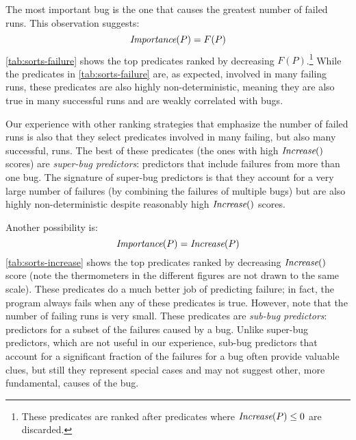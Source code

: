 The most important bug is the one that causes the greatest number
of failed runs.  This observation suggests:
\[ \textit{Importance}(P) = F(P) \]
\autoref{tab:sorts-failure} shows the top predicates 
ranked by decreasing $F(P)$.\footnote{These predicates are ranked after predicates where $\textit{Increase}(P) \leq 0$ are discarded.}
While the predicates in \autoref{tab:sorts-failure} are, as expected, involved
in many failing runs, these predicates are also highly 
non-deterministic, meaning they are also true in many successful runs
and are weakly correlated with bugs.  

Our experience with other
ranking strategies that emphasize the number of failed runs is also that
they select predicates involved in many failing, but also many
successful, runs.  The best of these predicates (the ones with high
$\textit{Increase}()$ scores) are {\em super-bug predictors}:
predictors that include failures from more than one bug.  The
signature of super-bug predictors is that they account for a very
large number of failures (by combining the failures of multiple bugs)
but are also highly non-deterministic despite reasonably high $\textit{Increase}()$
scores.

Another possibility is:
\[ \textit{Importance}(P) = \textit{Increase}(P) \]
\autoref{tab:sorts-increase} shows the top predicates ranked by decreasing
$\textit{Increase}()$ score (note the thermometers in the different figures
are not drawn to the same scale).  These predicates do a much better
job of predicting failure; in fact, the program always fails when any
of these predicates is true. However, note that the number of failing
runs is very small.  These predicates are {\em sub-bug predictors}:
predictors for a subset of the failures caused by a bug.  Unlike
super-bug predictors, which are not useful in our experience, sub-bug
predictors that account for a significant fraction of the failures for
a bug often provide valuable clues, but still they represent special
cases and may not suggest other, more fundamental, causes of the bug.

